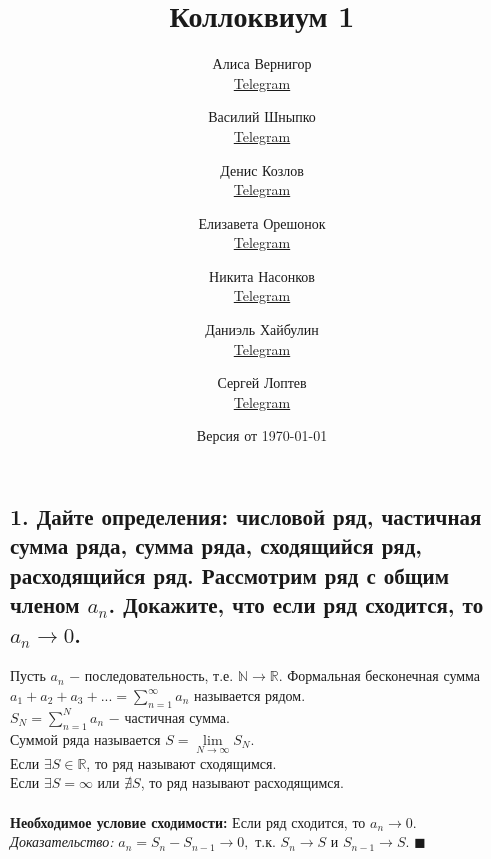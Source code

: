 \documentclass[a4paper, fleqn]{article}
\title{Коллоквиум 1}
\author{
    Алиса Вернигор       \\ \href{https://t.me/allisyonok}{Telegram} \and
    Василий Шныпко       \\ \href{https://t.me/yourvash}{Telegram} \and
    Денис Козлов         \\ \href{https://t.me/DKozl50}{Telegram} \and
    Елизавета Орешонок   \\ \href{https://t.me/eaoresh}{Telegram} \and
    Никита Насонков      \\ \href{https://t.me/nnv_nick}{Telegram} \and
    Даниэль Хайбулин      \\ \href{https://t.me/kiDaniel}{Telegram} \and
    Сергей Лоптев        \\ \href{https://t.me/beast_sl}{Telegram}
}
\date{Версия от {\ddmmyyyydate\today} \currenttime}
\begin{document}
    \maketitle
    
    
    \subsection*{1. Дайте определения: числовой ряд, частичная сумма ряда, сумма ряда, сходящийся ряд, расходящийся ряд. Рассмотрим ряд с общим членом $a_n$. Докажите, что если ряд сходится, то $a_n \rightarrow 0$.}
    Пусть $a_n$ $-$ последовательность, т.е. $\mathbb{N} \rightarrow \mathbb{R}$. 
    Формальная бесконечная сумма $a_1 + a_2 + a_3 + ... = \sum\limits_{n = 1}^{\infty} a_n$ называется рядом. \\
    $S_N = \sum\limits_{n = 1}^N a_n$ $-$ частичная сумма. \\
    Суммой ряда называется $S = \lim\limits_{N\rightarrow \infty} S_N$. \\
    Если $\exists S \in \mathbb{R}$, то ряд называют сходящимся. \\
    Если $\exists S = \infty$ или $\nexists S$, то ряд называют расходящимся. \\ \\
    \textbf{Необходимое условие сходимости: } Если ряд сходится, то $a_n \rightarrow 0$. \\
    \textit{Доказательство: } $a_n = S_n - S_{n - 1} \rightarrow 0, $ т.к. $S_n \rightarrow S$ и $S_{n - 1} \rightarrow S$. $\blacksquare$ \\

\end{document}
